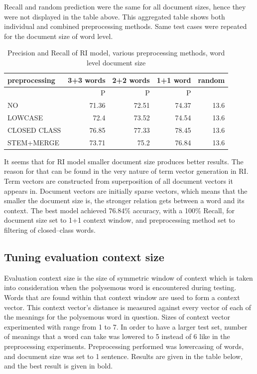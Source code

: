 Recall and random prediction were the same for all document sizes, hence they were not displayed in the table above. This aggregated table shows both individual and combined preprocessing methods. Same test cases were 
repeated for the document size of word level. 

\begin{table}[h!]
\begin{tabular}{ l |  r | r | r | r}
   preprocessing &  3+3 words& 2+2 words& 1+1 word& random\\
\hline
	& P  &  P  &  P  &  \\
\hline\hline
NO &  71.36 & 72.51 & 74.37  & 13.6\\
LOWCASE  &72.4 & 73.52 & 74.54 &13.6   \\
CLOSED CLASS & 76.85 &77.33 &78.45 & 13.6\\
STEM+MERGE   & 73.71  & 75.2 & 76.84 &13.6\\
\end{tabular}
\caption{Precision and Recall of RI model, various preprocessing methods, word level document size}
\end{table}


It seems that for RI model smaller document size produces better results. The reason for that can be found in the very nature of term vector generation in RI. Term vectors are constructed from 
superposition of all document vectors it appears in. Document vectors are initially sparse vectors, which
means that the smaller the document size is, the stronger relation gets between a word and its context.
The best model achieved 76.84\% accuracy, with a 100\% Recall, for document size set to 1+1 context
window, and preprocessing method set to filtering of closed--class words.

\subsection{Tuning evaluation context size}
Evaluation context size is the size of symmetric window of context which is taken into consideration 
when the polysemous word is encountered during testing. Words that are found within that context
window are used to form a context vector. This context vector's distance is measured against every
vector of each  of the meanings for the polysemous word in question. Sizes of context vector 
experimented with range from 1 to 7. In order to have a larger test set, number of meanings that 
a word can take was lowered to 5 instead of 6 like in the preprocessing experiments. Preprocessing
performed was lowercasing of words, and document size was set to 1 sentence. 
Results are given 
in the table below, and the best result is given in bold. 

